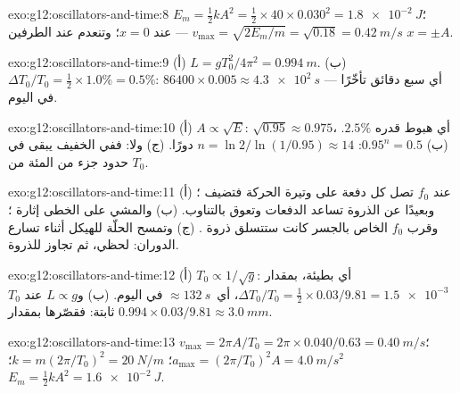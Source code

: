 \begin{solution}{exo:g12:oscillators-and-time:8}
$E_m = \tfrac12 kA^2 = \tfrac12 \times 40 \times 0.030^2 =
\qty{1.8e-2}{J}$؛ $v_{\max} = \sqrt{2E_m/m} = \sqrt{0.18} =
\qty{0.42}{m/s}$ --- عند $x = 0$؛ وتنعدم عند الطرفين $x = \pm A$.
\end{solution}

\begin{solution}{exo:g12:oscillators-and-time:9}
(أ) $L = gT_0^2/4\pi^2 = \qty{0.994}{m}$. (ب) $\Delta T_0/T_0 =
\tfrac12 \times 1.0\% = 0.5\%$: $86400 \times 0.005 \approx
\qty{4.3e2}{s}$ --- أي سبع دقائق تأخّرًا في اليوم.
\end{solution}

\begin{solution}{exo:g12:oscillators-and-time:10}
(أ) $A \propto \sqrt{E}$: $\sqrt{0.95} \approx 0.975$، أي هبوط قدره $2.5\%$.
(ب) $0.95^n = 0.5$: $n = \ln 2/\ln(1/0.95) \approx 14$
دورًا. (ج) ولا: ففي  الخفيف يبقى في حدود جزء من
المئة من $T_0$.
\end{solution}

\begin{solution}{exo:g12:oscillators-and-time:11}
(أ) عند $f_0$ تصل كل دفعة على وتيرة الحركة فتضيف ؛ وبعيدًا عن الذروة
تساعد الدفعات وتعوق بالتناوب. (ب) والمشي على الخطى إثارة
؛ وقرب $f_0$ الخاص بالجسر كانت ستتسلق ذروة
. (ج) وتمسح الحلّة  للهيكل
أثناء تسارع الدوران:  لحظي، ثم تجاوز للذروة.
\end{solution}

\begin{solution}{exo:g12:oscillators-and-time:12}
(أ) $T_0 \propto 1/\sqrt{g}$: أي بطيئة، بمقدار $\Delta T_0/T_0 = \tfrac12
\times 0.03/9.81 = \num{1.5e-3}$، أي\ $\approx \qty{132}{s}$ في
اليوم. (ب) و$L \propto g$ عند $T_0$ ثابتة: فقصّرها بمقدار $0.994 \times
0.03/9.81 \approx \qty{3.0}{mm}$.
\end{solution}

\begin{solution}{exo:g12:oscillators-and-time:13}
$v_{\max} = 2\pi A/T_0 = 2\pi \times 0.040/0.63 = \qty{0.40}{m/s}$؛
$a_{\max} = (2\pi/T_0)^2 A = \qty{4.0}{m/s^2}$؛ $k = m(2\pi/T_0)^2
= \qty{20}{N/m}$؛ $E_m = \tfrac12 kA^2 = \qty{1.6e-2}{J}$.
\end{solution}

